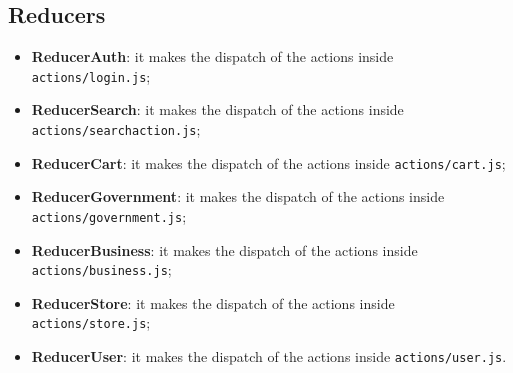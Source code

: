 \subsection{Reducers}
\begin{itemize}
	\item \textbf{ReducerAuth}: it makes the dispatch of the actions inside \texttt{actions/login.js};
	\item \textbf{ReducerSearch}: it makes the dispatch of the actions inside \texttt{actions/searchaction.js};
	\item \textbf{ReducerCart}: it makes the dispatch of the actions inside \texttt{actions/cart.js};
	\item \textbf{ReducerGovernment}: it makes the dispatch of the actions inside \texttt{actions/government.js};
	\item \textbf{ReducerBusiness}: it makes the dispatch of the actions inside \texttt{actions/business.js};
	\item \textbf{ReducerStore}: it makes the dispatch of the actions inside \texttt{actions/store.js};
	\item \textbf{ReducerUser}: it makes the dispatch of the actions inside \texttt{actions/user.js}.
\end{itemize}
